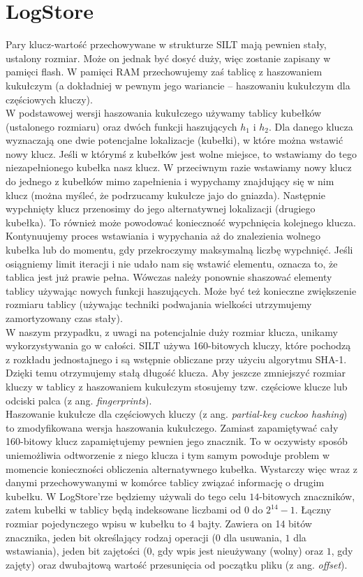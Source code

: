 \documentclass[declaration,shortabstract,masc]{iithesis}
\begin{document}
		\section{LogStore}
			Pary klucz-wartość przechowywane w strukturze SILT mają pewnien stały, ustalony rozmiar. Może on jednak być dosyć duży, więc zostanie zapisany w pamięci flash. W pamięci RAM przechowujemy zaś tablicę z haszowaniem kukułczym (a dokładniej w pewnym jego wariancie -- haszowaniu kukułczym dla częściowych kluczy).\\
			\indent W podstawowej wersji haszowania kukułczego używamy tablicy kubełków (ustalonego rozmiaru) oraz dwóch funkcji haszujących $h_1$ i $h_2$. Dla danego klucza wyznaczają one dwie potencjalne lokalizacje (kubełki), w które można wstawić nowy klucz. Jeśli w którymś z kubełków jest wolne miejsce, to wstawiamy do tego niezapełnionego kubełka nasz klucz. W przeciwnym razie wstawiamy nowy klucz do jednego z kubełków mimo zapełnienia i wypychamy znajdujący się w nim klucz (można myśleć, że podrzucamy kukułcze jajo do gniazda). Następnie wypchnięty klucz przenosimy do jego alternatywnej lokalizacji (drugiego kubełka). To również może powodować konieczność wypchnięcia kolejnego klucza. Kontynuujemy proces wstawiania i wypychania aż do znalezienia wolnego kubełka lub do momentu, gdy przekroczymy maksymalną liczbę wypchnięć. Jeśli osiągniemy limit iteracji i nie udało nam się wstawić elementu, oznacza to, że tablica jest już prawie pełna. Wówczas należy ponownie shaszować elementy tablicy używając nowych funkcji haszujących. Może być też konieczne zwiększenie rozmiaru tablicy (używając techniki podwajania wielkości utrzymujemy zamortyzowany czas stały).\\
			\indent W naszym przypadku, z uwagi na potencjalnie duży rozmiar klucza, unikamy wykorzystywania go w całości. SILT używa 160-bitowych kluczy, które pochodzą z rozkładu jednostajnego i są wstępnie obliczane przy użyciu algorytmu SHA-1. Dzięki temu otrzymujemy stałą długość klucza. Aby jeszcze zmniejszyć rozmiar kluczy w tablicy z haszowaniem kukułczym stosujemy tzw. częściowe klucze lub odciski palca (z ang. \textit{fingerprints}).\\
			\indent Haszowanie kukułcze dla częściowych kluczy (z ang. \textit{partial-key cuckoo hashing}) \cite{PKCH} to zmodyfikowana wersja haszowania kukułczego. Zamiast zapamiętywać cały 160-bitowy klucz zapamiętujemy pewnien jego znacznik. To w oczywisty sposób uniemożliwia odtworzenie z niego klucza i tym samym powoduje problem w momencie konieczności obliczenia alternatywnego kubełka. Wystarczy więc wraz z danymi przechowywanymi w komórce tablicy związać informację o drugim kubełku. W LogStore'rze będziemy używali do tego celu $14$-bitowych znaczników, zatem kubełki w tablicy będą indeksowane liczbami od $0$ do $2^{14} - 1$. Łączny rozmiar pojedynczego wpisu w kubełku to 4 bajty. Zawiera on 14 bitów znacznika, jeden bit określający rodzaj operacji ($0$ dla usuwania, $1$ dla wstawiania), jeden bit zajętości ($0$, gdy wpis jest nieużywany (wolny) oraz $1$, gdy zajęty) oraz dwubajtową wartość przesunięcia od początku pliku (z ang. \textit{offset}).\\
\end{document}
